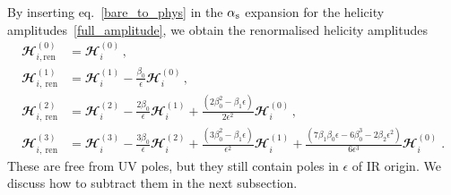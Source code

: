 By inserting  eq.~\eqref{bare_to_phys} in the $\alpha_\mathrm{s}$ expansion for the helicity amplitudes~\eqref{full_amplitude}, we obtain the renormalised helicity amplitudes
\begin{align}
\mathbfcal{H}_{i,\text{ren}}^{(0)} &=  \mathbfcal{H}_i^{(0)} \, , \\ %
\mathbfcal{H}_{i,\: \text{ren}}^{(1)} & =\mathbfcal{H}_i^{(1)}- \frac{\beta_0 }{\epsilon}   \mathbfcal{H}_i^{(0)} \, , \\ %
\mathbfcal{H}_{i,\: \text{ren}}^{(2)} &= \mathbfcal{H}_i^{(2)}  - \frac{2 \beta_0 }{\epsilon}  \mathbfcal{H}_i^{(1)}  + \frac{ \left(2 \beta_0^2- \beta_1\epsilon\right)}{2 \epsilon^2} \mathbfcal{H}_i^{(0)} \, ,\\ %
\mathbfcal{H}_{i,\: \text{ren}}^{(3)} & = \mathbfcal{H}_i^{(3)} -\frac{3 \beta_0}{\epsilon}    \mathbfcal{H}_i^{(2)} +\frac{ \left(3 \beta_0^2-\beta_1 \epsilon\right)}{\epsilon^2}  \mathbfcal{H}_i^{(1)} + \frac{ \left(7 \beta_1 \beta_0
   \epsilon -6 \beta_0^3-2 \beta_2 \epsilon^2 \right)}{6 \epsilon^3} \mathbfcal{H}_i^{(0)}  \; .
\label{hel_ampls_ren}
\end{align}
These are free from UV poles, but they still contain poles in $\epsilon$ of IR origin. We discuss how to subtract them in the next subsection.


